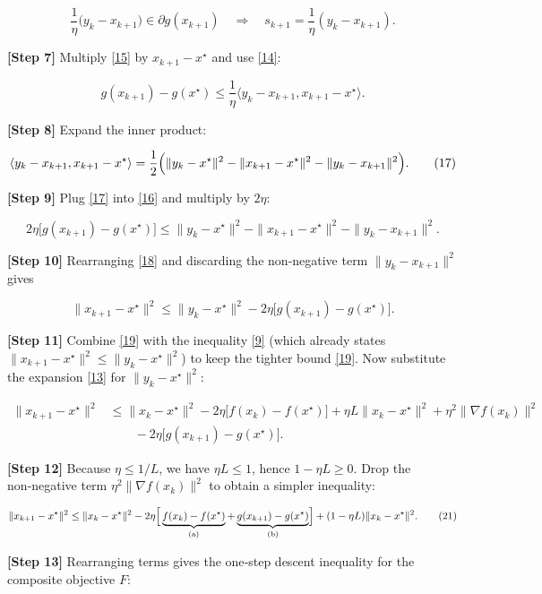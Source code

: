 \documentclass{article}
\begin{document}
\[
\frac{1}{\eta}\bigl(y_{k}-x_{k+1}\bigr)\in\partial g(x_{k+1})\quad\Rightarrow\quad
s_{k+1}= \frac{1}{\eta}(y_{k}-x_{k+1}). \tag{15}
\]

\noindent\textbf{[Step 7]} Multiply \eqref{15} by $x_{k+1}-x^{\star}$ and use \eqref{14}:

\[
g(x_{k+1})-g(x^{\star})
\le \frac{1}{\eta}\langle y_{k}-x_{k+1},x_{k+1}-x^{\star}\rangle.
\tag{16}
\]

\noindent\textbf{[Step 8]} Expand the inner product:

\[
\langle y_{k}-x_{k+1},x_{k+1}-x^{\star}\rangle
= \frac{1}{2}\Bigl(\|y_{k}-x^{\star}\|^{2}-\|x_{k+1}-x^{\star}\|^{2}-\|y_{k}-x_{k+1}\|^{2}\Bigr). \tag{17}
\]

\noindent\textbf{[Step 9]} Plug \eqref{17} into \eqref{16} and multiply by $2\eta$:

\[
2\eta\bigl[g(x_{k+1})-g(x^{\star})\bigr]
\le \|y_{k}-x^{\star}\|^{2}-\|x_{k+1}-x^{\star}\|^{2}-\|y_{k}-x_{k+1}\|^{2}. \tag{18}
\]

\noindent\textbf{[Step 10]} Rearranging \eqref{18} and discarding the non‑negative term $\|y_{k}-x_{k+1}\|^{2}$ gives

\[
\|x_{k+1}-x^{\star}\|^{2}
\le \|y_{k}-x^{\star}\|^{2}
-2\eta\bigl[g(x_{k+1})-g(x^{\star})\bigr]. \tag{19}
\]

\noindent\textbf{[Step 11]} Combine \eqref{19} with the inequality \eqref{9} (which already states $\|x_{k+1}-x^{\star}\|^{2}\le\|y_{k}-x^{\star}\|^{2}$) to keep the tighter bound \eqref{19}. Now substitute the expansion \eqref{13} for $\|y_{k}-x^{\star}\|^{2}$:

\[
\begin{aligned}
\|x_{k+1}-x^{\star}\|^{2}
&\le \|x_{k}-x^{\star}\|^{2}
-2\eta\bigl[f(x_{k})-f(x^{\star})\bigr]
+\eta L\|x_{k}-x^{\star}\|^{2}
+\eta^{2}\|\nabla f(x_{k})\|^{2} \\
&\qquad -2\eta\bigl[g(x_{k+1})-g(x^{\star})\bigr].
\end{aligned}
\tag{20}
\]

\noindent\textbf{[Step 12]} Because $\eta\le 1/L$, we have $\eta L\le1$, hence $1-\eta L\ge0$. Drop the non‑negative term $\eta^{2}\|\nabla f(x_{k})\|^{2}$ to obtain a simpler inequality:

\[
\|x_{k+1}-x^{\star}\|^{2}
\le \|x_{k}-x^{\star}\|^{2}
-2\eta\Bigl[\,\underbrace{f(x_{k})-f(x^{\star})}_{\text{(a)}}
+\underbrace{g(x_{k+1})-g(x^{\star})}_{\text{(b)}}\Bigr]
+ (1-\eta L)\|x_{k}-x^{\star}\|^{2}. \tag{21}
\]

\noindent\textbf{[Step 13]} Rearranging terms gives the one‑step descent inequality for the composite objective $F$:
\end{document}
